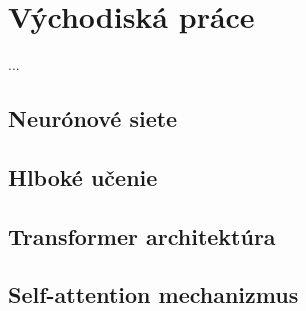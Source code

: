 \chapter{Východiská práce}

\label{kap:vychodiska}
\cite{vaswani2017attention} ... \cite{ViT_ICLR2021dosovitskiy}
\section{Neurónové siete}

\section{Hlboké učenie}

\section{Transformer architektúra}

\section{Self-attention mechanizmus}